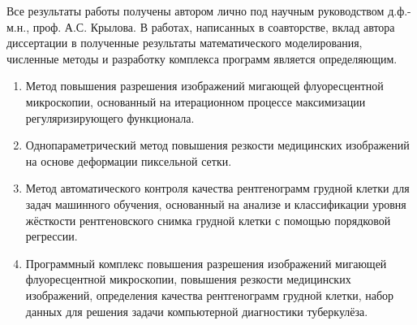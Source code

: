 {\begin{refsection}
    \end{refsection}%
}


{\contribution} 

Все результаты работы получены автором лично под научным руководством д.ф.-м.н., проф. А.С. Крылова. В работах, написанных в соавторстве, вклад автора диссертации в полученные результаты математического моделирования, численные методы и разработку комплекса программ является определяющим.

{}

\begin {enumerate}[beginpenalty=10000]
	\item Метод повышения разрешения изображений мигающей флуоресцентной микроскопии, основанный на итерационном процессе максимизации регуляризирующего функционала.
	
	\item Однопараметрический метод повышения резкости медицинских изображений на основе деформации пиксельной сетки.
	
	\item Метод автоматического контроля качества рентгенограмм грудной клетки для задач машинного обучения, основанный на анализе и классификации уровня жёсткости рентгеновского снимка грудной клетки с помощью порядковой регрессии.
	
	\item Программный комплекс повышения разрешения изображений мигающей флуоресцентной микроскопии, повышения резкости медицинских изображений, определения качества рентгенограмм грудной клетки, набор данных для решения задачи компьютерной диагностики туберкулёза.
\end {enumerate}


